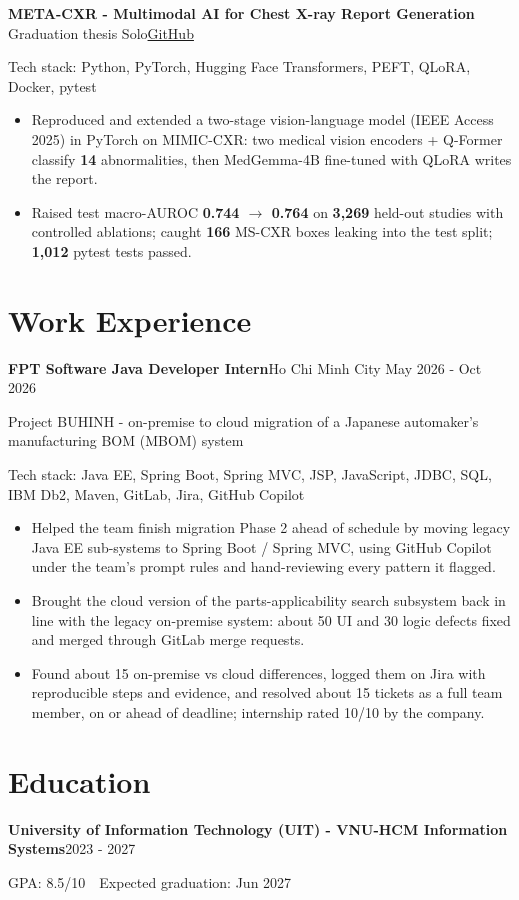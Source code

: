 \documentclass[10pt, a4paper]{article}
\newcommand{\entry}[2]{\textbf{#1}\hfill#2\par}
\newcommand{\subentry}[2]{{\color{MutedText}#1}\hfill{\color{MutedText}#2}\par}
\newcommand{\project}[3]{\textbf{#1}\,{\color{MutedText}\textbar{} #2}\hfill\href{#3}{GitHub}\par}
\newcommand{\techstack}[1]{{\color{MutedText}Tech stack: #1}\par}
\begin{document}
\project{META-CXR - Multimodal AI for Chest X-ray Report Generation}{Graduation thesis \textbullet{} Solo}{https://github.com/minhphuong150505/Meta-CXR}
\techstack{Python, PyTorch, Hugging Face Transformers, PEFT, QLoRA, Docker, pytest}
\begin{itemize}
  \item Reproduced and extended a two-stage vision-language model (IEEE Access 2025) in PyTorch on MIMIC-CXR: two medical vision encoders + Q-Former classify \textbf{14} abnormalities, then MedGemma-4B fine-tuned with QLoRA writes the report.
  \item Raised test macro-AUROC \textbf{0.744 $\rightarrow$ 0.764} on \textbf{3,269} held-out studies with controlled ablations; caught \textbf{166} MS-CXR boxes leaking into the test split; \textbf{1,012} pytest tests passed.
\end{itemize}

\section{Work Experience}
\entry{FPT Software \textbar{} Java Developer Intern}{Ho Chi Minh City \textbar{} May 2026 - Oct 2026}
\subentry{Project BUHINH - on-premise to cloud migration of a Japanese automaker's manufacturing BOM (MBOM) system}{}
\techstack{Java EE, Spring Boot, Spring MVC, JSP, JavaScript, JDBC, SQL, IBM Db2, Maven, GitLab, Jira, GitHub Copilot}
\begin{itemize}
  \item Helped the team finish migration Phase 2 ahead of schedule by moving legacy Java EE sub-systems to Spring Boot / Spring MVC, using GitHub Copilot under the team's prompt rules and hand-reviewing every pattern it flagged.
  \item Brought the cloud version of the parts-applicability search subsystem back in line with the legacy on-premise system: about 50 UI and 30 logic defects fixed and merged through GitLab merge requests.
  \item Found about 15 on-premise vs cloud differences, logged them on Jira with reproducible steps and evidence, and resolved about 15 tickets as a full team member, on or ahead of deadline; internship rated 10/10 by the company.
\end{itemize}

\section{Education}
\entry{University of Information Technology (UIT) - VNU-HCM \textbar{} Information Systems}{2023 - 2027}
GPA: 8.5/10 \,\textbar\, Expected graduation: Jun 2027\par
\end{document}
